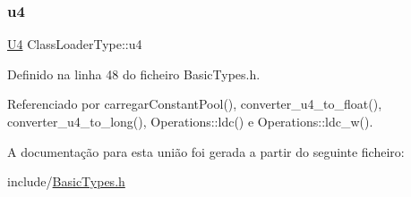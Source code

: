 \mbox{\label{unionClassLoaderType_aad01cfe6aac48729f55425b67a70622e}} 
\subsubsection{\texorpdfstring{u4}{u4}}
{\footnotesize\ttfamily \hyperlink{BasicTypes_8h_ac6d2ba2e53dd424684ead2f40e74a8b6}{U4} Class\+Loader\+Type\+::u4}



Definido na linha 48 do ficheiro Basic\+Types.\+h.



Referenciado por carregar\+Constant\+Pool(), converter\+\_\+u4\+\_\+to\+\_\+float(), converter\+\_\+u4\+\_\+to\+\_\+long(), Operations\+::ldc() e Operations\+::ldc\+\_\+w().



A documentação para esta união foi gerada a partir do seguinte ficheiro\+:\begin{DoxyCompactItemize}
\item 
include/\hyperlink{BasicTypes_8h}{Basic\+Types.\+h}\end{DoxyCompactItemize}
